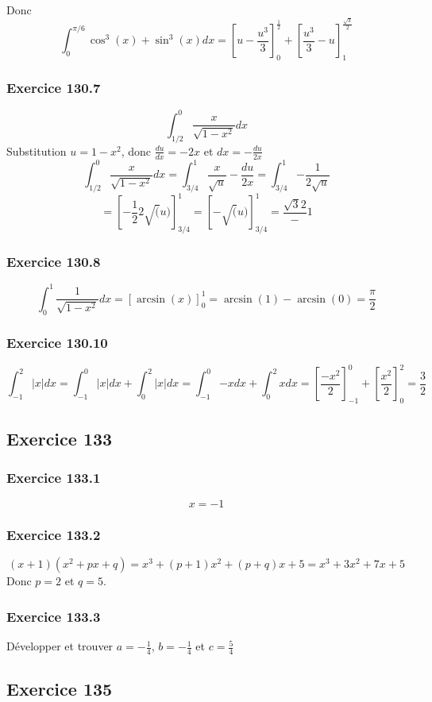\documentclass[]{book}
\theoremstyle{definition}
\begin{document}
Donc
$$\int_{0}^{\pi/6}{\cos^3(x) + \sin^3(x)dx} = \left[u-\frac{u^3}{3}\right]_{0}^{\frac{1}{2}} + \left[\frac{u^3}{3}-u\right]_{1}^{\frac{\sqrt{3}}{2}}$$

\subsubsection*{Exercice 130.7}
$$\int_{1/2}^{0}{\frac{x}{\sqrt{1-x^2}}dx}$$
Substitution $u=1-x^2$, donc $\frac{du}{dx} = -2x$ et $dx=-\frac{du}{2x}$
$$\int_{1/2}^{0}{\frac{x}{\sqrt{1-x^2}}dx} = \int_{3/4}^{1}{\frac{x}{\sqrt{u}}-\frac{du}{2x}} = \int_{3/4}^{1}{-\frac{1}{2\sqrt{u}}}$$
$$ = \left[-\frac{1}{2}2\sqrt(u)\right]_{3/4}^{1} = \left[-\sqrt(u)\right]_{3/4}^{1} = \frac{\sqrt{3}{2}}-1$$


\subsubsection*{Exercice 130.8}
$$\int_{0}^{1}{\frac{1}{\sqrt{1-x^2}}dx} = \left[\arcsin(x)\right]_{0}^{1} = \arcsin(1)-\arcsin(0) =\frac{\pi}{2}$$

\subsubsection*{Exercice 130.10}
$$\int_{-1}^{2}{|x|dx} = \int_{-1}^{0}{|x|dx} + \int_{0}^{2}{|x|dx} = \int_{-1}^{0}{-xdx} + \int_{0}^{2}{xdx} = \left[\frac{-x^2}{2}\right]_{-1}^{0} + \left[\frac{x^2}{2}\right]_{0}^{2} = \frac{3}{2}$$


\subsection*{Exercice 133}
\subsubsection*{Exercice 133.1}
$$x=-1$$
\subsubsection*{Exercice 133.2}
$$(x+1)(x^2+px+q) = x^3+(p+1)x^2+(p+q)x+5 = x^3+3x^2+7x+5$$
Donc $p=2$ et $q=5$.
\subsubsection*{Exercice 133.3}
D\'evelopper et trouver
$a=-\frac{1}{4}$, $b=-\frac{1}{4}$ et $c=\frac{5}{4}$



\subsection*{Exercice 135}
\end{document}
